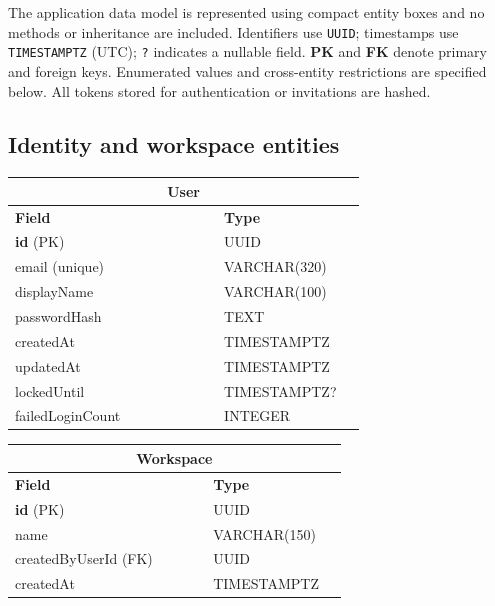 \documentclass[
    english, %
]{VUMIFPSkursinis}
\begin{document}
The application data model is represented using compact entity boxes and no methods or inheritance are included. Identifiers use \texttt{UUID}; timestamps use \texttt{TIMESTAMPTZ} (UTC); \texttt{?} indicates a nullable field. \textbf{PK} and \textbf{FK} denote primary and foreign keys. Enumerated values and cross-entity restrictions are specified below. All tokens stored for authentication or invitations are hashed.

\newcommand{\dmclass}[2]{%
\begin{minipage}[t]{0.485\textwidth}\centering\footnotesize
\renewcommand{\arraystretch}{1.12}%
\begin{tabular}{|p{0.535\linewidth}|p{0.365\linewidth}|}\hline
\multicolumn{2}{|c|}{\cellcolor[gray]{0.88}\textbf{#1}}\\\hline
\textbf{Field} & \textbf{Type}\\\hline
#2
\end{tabular}\end{minipage}}
\newcommand{\dmpair}[4]{\noindent\dmclass{#1}{#2}\hfill\dmclass{#3}{#4}\par\vspace{0.75em}}
\newcommand{\dmsingle}[2]{\noindent\dmclass{#1}{#2}\par\vspace{0.75em}}

\subsection{Identity and workspace entities}
\dmpair{User}{%
\textbf{id} (PK) & UUID\\\hline
email (unique) & VARCHAR(320)\\\hline
displayName & VARCHAR(100)\\\hline
passwordHash & TEXT\\\hline
createdAt & TIMESTAMPTZ\\\hline
updatedAt & TIMESTAMPTZ\\\hline
lockedUntil & TIMESTAMPTZ?\\\hline
failedLoginCount & INTEGER\\\hline
}{Workspace}{%
\textbf{id} (PK) & UUID\\\hline
name & VARCHAR(150)\\\hline
createdByUserId (FK) & UUID\\\hline
createdAt & TIMESTAMPTZ\\\hline
}
\end{document}
